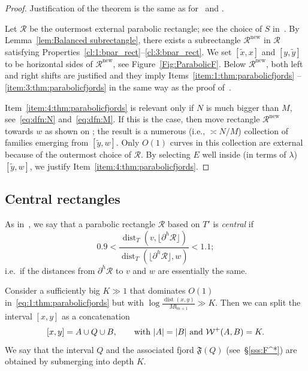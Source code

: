 \documentclass{amsart}
\newcommand{\1}{{\mathbb 1 }}
\newcommand{\Width}{{\mathcal W}}
\newcommand\RR{\mathcal{R}}
\newcommand{\length}{{\mathfrak l}}
\newcommand\new{{\operatorname{new}}}
\theoremstyle{remark}
\numberwithin{equation}{section}
\theoremstyle{definition}
\newcommand{\dist}{\operatorname{dist}}
\newcommand{\Fjord}{{\mathfrak F}}
\begin{document}
\begin{proof}
Justification of the theorem is the same as for~\cite[Theorem~4.1]{DL22} and \cite[Corollary~4.11]{DL22}.

Let $\RR$ be the outermost external parabolic rectangle; see the choice of $S$ in~\cite[(4.15)]{DL22}. By Lemma~\ref{lem:Balanced subrectangle}, there exists a subrectangle $\RR^\new$ in $\RR$ satisfying Properties~\ref{cl:1:bpar_rect}--\ref{cl:3:bpar_rect}.
We set $[\tilde x, x]$ and $[y,\tilde y]$ to be horizontal sides of $\RR^\new$, see Figure~\ref{Fig:ParabolicF}. Below $\RR^\new$, both left and right shifts are justified and they imply Items~\ref{item:1:thm:parabolicfjords} -- \ref{item:3:thm:parabolicfjords} in the same way as the proof of~\cite[Theorem~4.1]{DL22}.

Item~\ref{item:4:thm:parabolicfjords} is relevant only if $N$ is much bigger than $M$, see~\eqref{eq:dfn:N} and~\eqref{eq:dfn:M}. If this is the case, then move rectangle $\RR^\new$ towards $w$ as shown on \cite[Figure~14]{DL22}; the result is a numerous (i.e., $\asymp  N/M$) collection of families emerging from $[\tilde y, w]$. Only $O(1)$ curves in this collection are external because of the outermost choice of $\RR$. By selecting $E$ well inside (in terms of $\lambda$) $[\tilde y, w]$, we justify Item~\ref{item:4:thm:parabolicfjords}.
\end{proof}




\subsection{Central rectangles} As in~\cite[\S4.5]{DL22}, we say that a parabolic rectangle $\RR$ based on $T'$ is \emph{central} if 
\begin{equation}
    \label{eq:dfn:CentrRect}
0.9< \frac{\dist_T(v, \lfloor \partial^h \RR \rfloor)}{\dist_T( \lfloor \partial^h \RR \rfloor,w)}<1.1;
\end{equation}
i.e.~if the distances from $\partial^h \RR $ to $v$ and $w$ are essentially the same.


Consider a sufficiently big $K\gg 1$ that dominates $O(1)$ in~\eqref{eq:1:thm:parabolicfjords} but with $\log \frac{\dist(x,y)}{M\length_{m+1}}\gg K$. Then we can split the interval $[x,y]$ as a concatenation 
\begin{equation}
    \label{eq:depth:K}
[x,y]=A\cup Q \cup B,\qquad \text{with $ |A|=|B|$ and} \ \Width^+(A,B)=K.
\end{equation}
We say that the interval $Q$ and the associated fjord $\Fjord(Q)$ (see~\S\ref{sss:F^*}) are obtained by submerging into depth $K$. 
\end{document}
